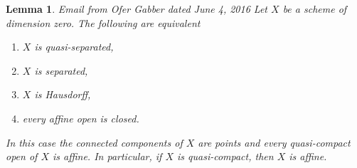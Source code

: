 \documentclass[10pt,a4paper]{amsart}
\newenvironment{reference}{\comment}{\endcomment}
\theoremstyle{plain}
\newtheorem{lemma}[subsection]{Lemma}
\theoremstyle{definition}
\theoremstyle{remark}
\numberwithin{equation}{subsection}
\begin{document}
\begin{lemma}
\label{lemma-dimension-zero}
\begin{reference}
Email from Ofer Gabber dated June 4, 2016
\end{reference}
Let $X$ be a scheme of dimension zero. The following are equivalent
\begin{enumerate}
\item $X$ is quasi-separated,
\item $X$ is separated,
\item $X$ is Hausdorff,
\item every affine open is closed.
\end{enumerate}
In this case the connected components of $X$ are points and every
quasi-compact open of $X$ is affine. In particular, if $X$
is quasi-compact, then $X$ is affine.
\end{lemma}
\end{document}
